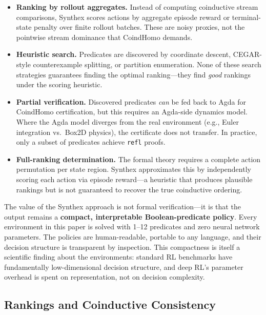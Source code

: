 \documentclass[9pt,a4paper]{article}
\theoremstyle{plain}
\theoremstyle{definition}
\theoremstyle{remark}
\begin{document}
\begin{itemize}
\item \textbf{Ranking by rollout aggregates.}  Instead of
      computing coinductive stream comparisons, Synthex scores
      actions by aggregate episode reward or terminal-state
      penalty over finite rollout batches.  These are noisy
      proxies, not the pointwise stream dominance that CoindHomo
      demands.

\item \textbf{Heuristic search.}  Predicates are discovered by
      coordinate descent, CEGAR-style counterexample splitting,
      or partition enumeration.  None of these search strategies
      guarantees finding the optimal ranking---they find
      \emph{good} rankings under the scoring heuristic.

\item \textbf{Partial verification.}  Discovered predicates
      \emph{can} be fed back to Agda for CoindHomo certification,
      but this requires an Agda-side dynamics model.  Where
      the Agda model diverges from the real environment
      (e.g., Euler integration vs.\ Box2D physics), the
      certificate does not transfer.  In practice, only a
      subset of predicates achieve \texttt{refl} proofs.

\item \textbf{Full-ranking determination.}  The formal theory
      requires a complete action permutation per state region.
      Synthex approximates this by independently scoring each
      action via episode reward---a heuristic that produces
      plausible rankings but is not guaranteed to recover the
      true coinductive ordering.
\end{itemize}

The value of the Synthex approach is not formal verification---it
is that the output remains a \textbf{compact, interpretable
Boolean-predicate policy}.  Every environment in this paper is
solved with 1--12 predicates and zero neural network parameters.
The policies are human-readable, portable to any language, and
their decision structure is transparent by inspection.  This
compactness is itself a scientific finding about the environments:
standard RL benchmarks have fundamentally low-dimensional decision
structure, and deep RL's parameter overhead is spent on
representation, not on decision complexity.

\subsection{Rankings and Coinductive Consistency}
\end{document}
